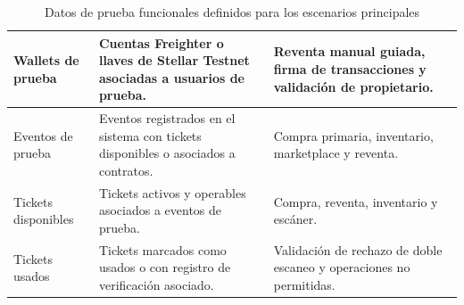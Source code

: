 \documentclass[12pt,letterpaper]{article}
\begin{document}
\begin{table}[H]
\begin{tabularx}{\textwidth}{|
>{\raggedright\arraybackslash}p{3.3cm}|
>{\raggedright\arraybackslash}X|
>{\raggedright\arraybackslash}p{4.8cm}|}
Wallets de prueba &
Cuentas Freighter o llaves de Stellar Testnet asociadas a usuarios de prueba. &
Reventa manual guiada, firma de transacciones y validación de propietario. \\
\hline

Eventos de prueba &
Eventos registrados en el sistema con tickets disponibles o asociados a contratos. &
Compra primaria, inventario, marketplace y reventa. \\
\hline

Tickets disponibles &
Tickets activos y operables asociados a eventos de prueba. &
Compra, reventa, inventario y escáner. \\
\hline

Tickets usados &
Tickets marcados como usados o con registro de verificación asociado. &
Validación de rechazo de doble escaneo y operaciones no permitidas. \\
\hline

\end{tabularx}

\endgroup

\caption{Datos de prueba funcionales definidos para los escenarios principales}
\label{tab:datos-prueba-funcionales}
\end{table}
\end{document}
